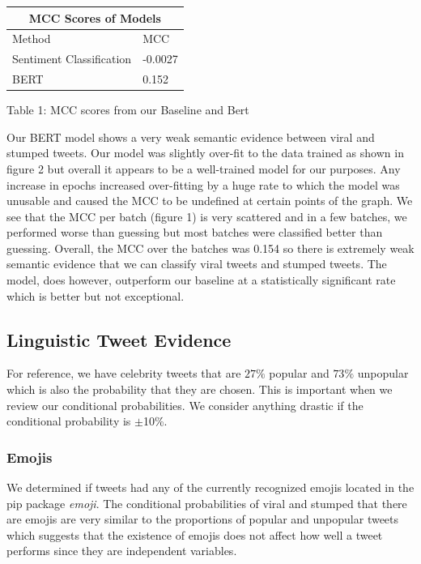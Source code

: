 \documentclass{article}
\begin{document}
{
\begin{tabular}{ |p{3.5 cm}|p{3.5cm}|  }
\hline
\multicolumn{2}{|c|}{MCC Scores of Models} \\
\hline
Method & MCC \\
\hline
Sentiment Classification & -0.0027 \\
BERT & 0.152 \\
\hline
\end{tabular}
\centerline{ }

\centerline{Table 1: MCC scores from our Baseline and Bert}
}
\vspace{.5cm}

Our BERT model shows a very weak semantic evidence between viral and stumped tweets. 
Our model was slightly over-fit to the data trained as shown in figure 2 but overall it appears to be a well-trained model for our purposes. 
Any increase in epochs increased over-fitting by a huge rate to which the model was unusable and caused the MCC to be undefined at certain points of the graph.
We see that the MCC per batch (figure 1) is very scattered and in a few batches, we performed worse than guessing but most batches were classified better than guessing. 
Overall, the MCC over the batches was 0.154 so there is extremely weak semantic evidence that we can classify viral tweets and stumped tweets. 
The model, does however, outperform our baseline at a statistically significant rate which is better but not exceptional.

\subsection{Linguistic Tweet Evidence}
For reference, we have celebrity tweets that are $27\%$ popular and $73\%$ unpopular which is also the probability that they are chosen. 
This is important when we review our conditional probabilities. 
We consider anything drastic if the conditional probability is $\pm$10\%. 

\subsubsection{Emojis}

We determined if tweets had any of the currently recognized emojis located in the pip package \textit{emoji}. 
The conditional probabilities of viral and stumped that there are emojis are very similar to the proportions of popular and unpopular tweets which suggests that the existence of emojis does not affect how well a tweet performs since they are independent variables. \\
\end{document}
